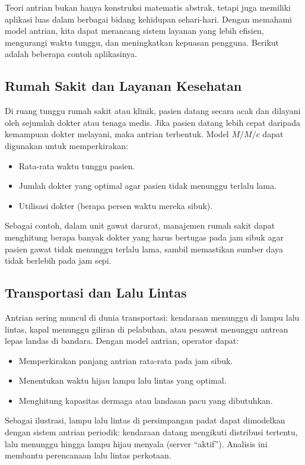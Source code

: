 \documentclass{bukumjh}
\begin{document}
Teori antrian bukan hanya konstruksi matematis abstrak, tetapi juga memiliki aplikasi luas dalam berbagai bidang kehidupan sehari-hari. Dengan memahami model antrian, kita dapat merancang sistem layanan yang lebih efisien, mengurangi waktu tunggu, dan meningkatkan kepuasan pengguna. Berikut adalah beberapa contoh aplikasinya.

\subsection{Rumah Sakit dan Layanan Kesehatan}

Di ruang tunggu rumah sakit atau klinik, pasien datang secara acak dan dilayani oleh sejumlah dokter atau tenaga medis. Jika pasien datang lebih cepat daripada kemampuan dokter melayani, maka antrian terbentuk. Model $M/M/c$ dapat digunakan untuk memperkirakan:
\begin{itemize}
    \item Rata-rata waktu tunggu pasien.
    \item Jumlah dokter yang optimal agar pasien tidak menunggu terlalu lama.
    \item Utilisasi dokter (berapa persen waktu mereka sibuk).
\end{itemize}

Sebagai contoh, dalam unit gawat darurat, manajemen rumah sakit dapat menghitung berapa banyak dokter yang harus bertugas pada jam sibuk agar pasien gawat tidak menunggu terlalu lama, sambil memastikan sumber daya tidak berlebih pada jam sepi.

\subsection{Transportasi dan Lalu Lintas}

Antrian sering muncul di dunia transportasi: kendaraan menunggu di lampu lalu lintas, kapal menunggu giliran di pelabuhan, atau pesawat menunggu antrean lepas landas di bandara. Dengan model antrian, operator dapat:
\begin{itemize}
    \item Memperkirakan panjang antrian rata-rata pada jam sibuk.
    \item Menentukan waktu hijau lampu lalu lintas yang optimal.
    \item Menghitung kapasitas dermaga atau landasan pacu yang dibutuhkan.
\end{itemize}

Sebagai ilustrasi, lampu lalu lintas di persimpangan padat dapat dimodelkan dengan sistem antrian periodik: kendaraan datang mengikuti distribusi tertentu, lalu menunggu hingga lampu hijau menyala (server “aktif”). Analisis ini membantu perencanaan lalu lintas perkotaan.
\end{document}
